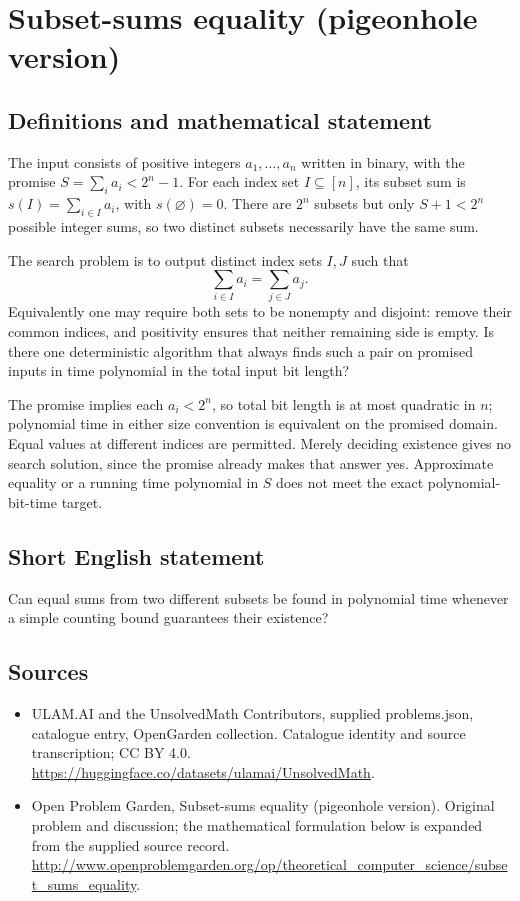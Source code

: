 \documentclass[11pt,a4paper]{article}
\begin{document}
\section*{Subset-sums equality (pigeonhole version)}\label{statement}

\subsection{Definitions and mathematical statement}
The input consists of positive integers $a_1,\ldots,a_n$ written in
binary, with the promise
$S=\sum_i a_i<2^n-1$. For each index set $I\subseteq[n]$, its subset
sum is $s(I)=\sum_{i\in I}a_i$, with $s(\varnothing)=0$.
There are $2^n$ subsets but only $S+1<2^n$ possible integer sums,
so two distinct subsets necessarily have the same sum.

The search problem is to output distinct index sets $I,J$ such that
\[
                         \sum_{i\in I}a_i=\sum_{j\in J}a_j.
\]
Equivalently one may require both sets to be nonempty and disjoint:
remove their common indices, and positivity ensures that neither
remaining side is empty. Is there one deterministic algorithm that
always finds such a pair on promised inputs in time polynomial in
the total input bit length?

The promise implies each $a_i<2^n$, so total bit length is at most
quadratic in $n$; polynomial time in either size convention is
equivalent on the promised domain. Equal values at different indices
are permitted. Merely deciding existence gives no search solution,
since the promise already makes that answer yes. Approximate
equality or a running time polynomial in $S$ does not meet the
exact polynomial-bit-time target.
\subsection{Short English statement}
Can equal sums from two different subsets be found in polynomial time whenever a simple counting bound guarantees their existence?
\subsection{Sources}
\begin{itemize}
\item[S1] ULAM.AI and the UnsolvedMath Contributors, supplied problems.json, catalogue entry, OpenGarden collection. Catalogue identity and source transcription; CC BY 4.0.
\url{https://huggingface.co/datasets/ulamai/UnsolvedMath}.
\item[S2] Open Problem Garden, Subset-sums equality (pigeonhole version). Original problem and discussion; the mathematical formulation below is expanded from the supplied source record.
\url{http://www.openproblemgarden.org/op/theoretical_computer_science/subset_sums_equality}.
\end{itemize}
\end{document}
